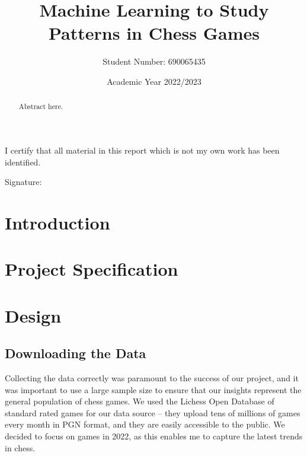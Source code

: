 \documentclass[a4paper, 11pt]{article}
\begin{document}
\title{Machine Learning to Study Patterns in Chess Games}
\author{Student Number: 690065435}
\date{Academic Year 2022/2023}

\maketitle

\begin{abstract}
{Abstract here}.

\begin{center}
\end{center}
\end{abstract}

\vspace*{\fill}
\begin{center}

\vspace{1em}
I certify that all material in this report which is not my own work has been identified.
\end{center}
\vspace{1em}

Signature: \hrulefill

\newpage

\section{Introduction}

\section{Project Specification}

\section{Design}

\subsection{Downloading the Data}
Collecting the data correctly was paramount to the success of our project, and it was important to use a large sample size to ensure that our insights represent the general population of chess games. We used the Lichess Open Database \cite{lichessOpenDatabase} of standard rated games for our data source -- they upload tens of millions of games every month in PGN format, and they are easily accessible to the public. We decided to focus on games in 2022, as this enables me to capture the latest trends in chess.
\end{document}
